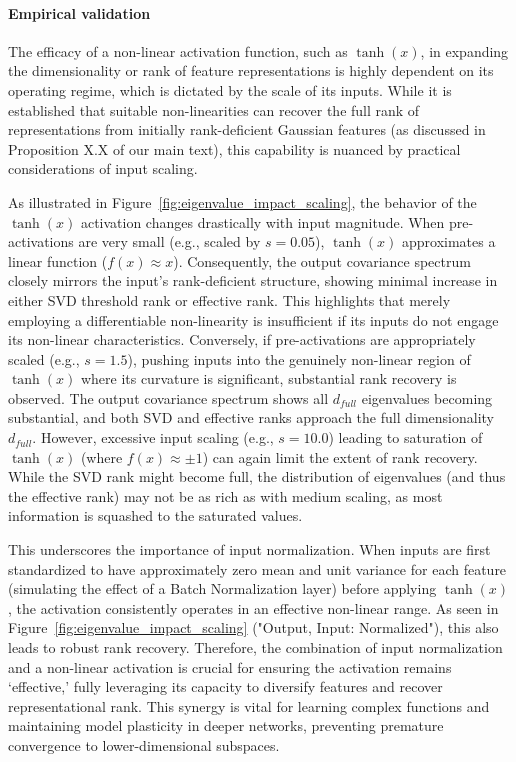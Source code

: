\documentclass{article}
\begin{document}
\paragraph{Empirical validation}
The efficacy of a non-linear activation function, such as $\tanh(x)$, in expanding the dimensionality or rank of feature representations is highly dependent on its operating regime, which is dictated by the scale of its inputs. While it is established that suitable non-linearities can recover the full rank of representations from initially rank-deficient Gaussian features (as discussed in Proposition X.X of our main text), this capability is nuanced by practical considerations of input scaling.

As illustrated in Figure~\ref{fig:eigenvalue_impact_scaling}, the behavior of the $\tanh(x)$ activation changes drastically with input magnitude.
When pre-activations are very small (e.g., scaled by $s=0.05$), $\tanh(x)$ approximates a linear function ($f(x) \approx x$). Consequently, the output covariance spectrum closely mirrors the input's rank-deficient structure, showing minimal increase in either SVD threshold rank or effective rank. This highlights that merely employing a differentiable non-linearity is insufficient if its inputs do not engage its non-linear characteristics.
Conversely, if pre-activations are appropriately scaled (e.g., $s=1.5$), pushing inputs into the genuinely non-linear region of $\tanh(x)$ where its curvature is significant, substantial rank recovery is observed. The output covariance spectrum shows all $d_{full}$ eigenvalues becoming substantial, and both SVD and effective ranks approach the full dimensionality $d_{full}$. However, excessive input scaling (e.g., $s=10.0$) leading to saturation of $\tanh(x)$ (where $f(x) \approx \pm 1$) can again limit the extent of rank recovery. While the SVD rank might become full, the distribution of eigenvalues (and thus the effective rank) may not be as rich as with medium scaling, as most information is squashed to the saturated values.

This underscores the importance of input normalization. When inputs are first standardized to have approximately zero mean and unit variance for each feature (simulating the effect of a Batch Normalization layer) before applying $\tanh(x)$, the activation consistently operates in an effective non-linear range. As seen in Figure~\ref{fig:eigenvalue_impact_scaling} ("Output, Input: Normalized"), this also leads to robust rank recovery. Therefore, the combination of input normalization and a non-linear activation is crucial for ensuring the activation remains `effective,' fully leveraging its capacity to diversify features and recover representational rank. This synergy is vital for learning complex functions and maintaining model plasticity in deeper networks, preventing premature convergence to lower-dimensional subspaces.
\end{document}

